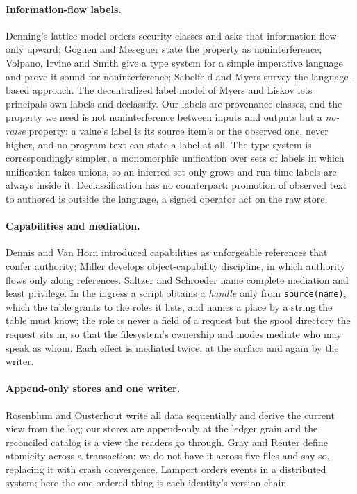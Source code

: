 \documentclass[11pt]{article}
\theoremstyle{plain}
\theoremstyle{definition}
\theoremstyle{remark}
\newcommand{\code}[1]{\texttt{#1}}
\begin{document}
\paragraph{Information-flow labels.}
Denning's lattice model \citep{denning1976} orders security classes and asks that information
flow only upward; Goguen and Meseguer \citep{goguen1982} state the property as noninterference;
Volpano, Irvine and Smith \citep{volpano1996} give a type system for a simple imperative language
and prove it sound for noninterference; Sabelfeld and Myers \citep{sabelfeld2003} survey the
language-based approach. The decentralized label model of Myers and Liskov \citep{myers1997}
lets principals own labels and declassify. Our labels are provenance classes, and the property
we need is not noninterference between inputs and outputs but a \emph{no-raise} property: a
value's label is its source item's or the observed one, never higher, and no program text can
state a label at all. The type system is correspondingly simpler, a monomorphic unification over
sets of labels in which unification takes unions, so an inferred set only grows and run-time
labels are always inside it. Declassification has no counterpart: promotion of observed text to
authored is outside the language, a signed operator act on the raw store.

\paragraph{Capabilities and mediation.}
Dennis and Van Horn \citep{dennis1966} introduced capabilities as unforgeable references that
confer authority; Miller \citep{miller2006} develops object-capability discipline, in which
authority flows only along references. Saltzer and Schroeder \citep{saltzer1975} name complete
mediation and least privilege. In the ingress a script obtains a \emph{handle} only from
\code{source(name)}, which the table grants to the roles it lists, and names a place by a string
the table must know; the role is never a field of a request but the spool directory the request
sits in, so that the filesystem's ownership and modes mediate who may speak as whom. Each
effect is mediated twice, at the surface and again by the writer.

\paragraph{Append-only stores and one writer.}
Rosenblum and Ousterhout \citep{rosenblum1992} write all data sequentially and derive the current
view from the log; our stores are append-only at the ledger grain and the reconciled catalog is
a view the readers go through. Gray and Reuter \citep{gray1993} define atomicity across a
transaction; we do not have it across five files and say so, replacing it with crash
convergence. Lamport \citep{lamport1978} orders events in a distributed system; here the one
ordered thing is each identity's version chain.
\end{document}
